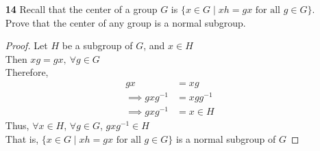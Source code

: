\documentclass[paper=usletter, fontsize=12pt]{article}
\begin{document}
\begin{itemize}
\begin{enumerate}
\begin{proof}
                Given $G = \{f_{m,b}: \mathbb{R} \rightarrow \mathbb{R} \mid m \neq 0 \text{ and } f_{m,b}(x)=mx+b\}$\\
                Consider,
                \begin{align*}
                    (f_{n,a} \circ f_{m,b}) & = f_{n,a}(f_{m,b})\\
                    & = f_{n,a}(mx+b)\\
                    & = n(mx+b)+a\\
                    & = nmx+bn+a\\
                    & = f_{nm,bn+a}
                \end{align*}
                Therefore,
                \begin{align*}
                    \phi(f_{n,a} \circ f_{m,b}) & = \phi(f_{nm,bn+a})\\
                    & = nm\\
                    & = \phi(f_{n,a})\phi(f_{m,b})
                \end{align*}
                Therefore, $\phi$ is a homomorphism\\
                By definition,
                \begin{align*}
                    \ker(\phi) & = \{f_{m,b} \in G \mid \phi(f_{m,b})=1\}\\
                    & = \{f_{m,b} \in G \mid m=1\}
                \end{align*}
                By definition,
                \begin{align*}
                    \text{img}(\phi) & = \{m \in \mathbb{R}^{\times} \mid \phi(f_{m,b})=m\}\\
                    & = \mathbb{R}^{\times}
                \end{align*} \qedhere

            \end{proof}

            \item[\textbf{14}] Recall that the center of a group $G$ is $\{x
            \in G \mid xh=gx \text{ for all } g \in G\}$. Prove that the center
            of any group is a normal subgroup.
            \begin{proof}

                Let $H$ be a subgroup of $G$, and $x\in H$\\
                Then $xg=gx, \ \forall g \in G$\\
                Therefore,
                \begin{align*}
                    gx & = xg \\
                    \implies gxg^{-1} & = xgg^{-1}\\
                    \implies gxg^{-1} & = x \in H
                \end{align*}
                Thus, $\forall x \in H$, $\forall g \in G$, $gxg^{-1} \in H$\\
                That is, $\{x \in G \mid xh=gx \text{ for all } g \in G\}$ is a
                normal subgroup of $G$ \qedhere


\end{proof}
\end{enumerate}
\end{itemize}
\end{document}
